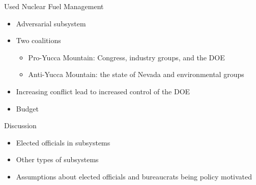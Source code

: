 \documentclass{beamer}
\begin{document}
\begin{frame}{Used Nuclear Fuel Management}

\begin{itemize}
\itemsep1pt\parskip0pt
\item
  Adversarial subsystem
\end{itemize}

\vspace{0.1in}

\begin{itemize}
\itemsep1pt\parskip0pt
\item
  Two coalitions

  \begin{itemize}
  \itemsep1pt\parskip0pt
  \item
    Pro-Yucca Mountain: Congress, industry groups, and the DOE
  \item
    Anti-Yucca Mountain: the state of Nevada and environmental groups
  \end{itemize}
\end{itemize}

\vspace{0.1in}

\begin{itemize}
\itemsep1pt\parskip0pt
\item
  Increasing conflict lead to increased control of the DOE
\end{itemize}

\vspace{0.1in}

\begin{itemize}
\itemsep1pt\parskip0pt
\item
  Budget
\end{itemize}

\end{frame}

\begin{frame}{Discussion}

\begin{itemize}
\itemsep1pt\parskip0pt
\item
  Elected officials in subsystems
\end{itemize}

\vspace{0.25in}

\begin{itemize}
\itemsep1pt\parskip0pt
\item
  Other types of subsystems
\end{itemize}

\vspace{0.25in}

\begin{itemize}
\itemsep1pt\parskip0pt
\item
  Assumptions about elected officials and bureaucrats being policy
  motivated
\end{itemize}

\end{frame}
\end{document}
